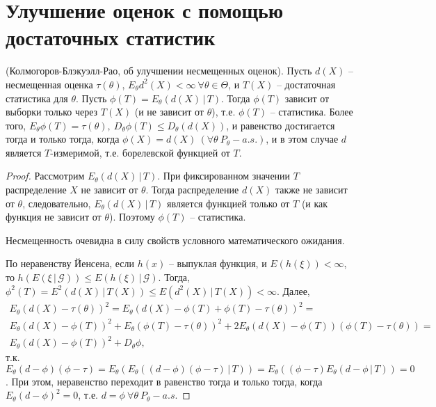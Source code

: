    \section{Улучшение оценок с помощью достаточных статистик}
    
    \begin{theorem}
        (Колмогоров-Блэкуэлл-Рао, об улучшении несмещенных оценок). Пусть $d(X)$ -- несмещенная оценка $\tau(\theta)$, $E_\theta d^2(X) < \infty\ \forall \theta \in \Theta$, и $T(X)$ -- достаточная статистика для $\theta$. Пусть $\phi(T) = E_\theta(d(X)\, \vert\, T)$. Тогда $\phi(T)$ зависит от выборки только через $T(X)$ (и не зависит от $\theta$), т.е. $\phi(T)$ -- статистика. Более того, $E_\theta \phi(T) = \tau(\theta),\ D_\theta \phi(T) \leq D_\theta(d(X))$, и равенство достигается тогда и только тогда, когда $\phi(X) = d(X)\ (\forall \theta\ P_\theta-a.s.)$, и в этом случае $d$ является $T$-измеримой, т.е. борелевской функцией от $T$.
    \end{theorem}
    
    \begin{proof}
        Рассмотрим  $E_\theta(d(X)\, \vert\, T)$. При фиксированном значении $T$ распределение $X$ не зависит от $\theta$. Тогда распределение $d(X)$ также не зависит от $\theta$, следовательно, $E_\theta(d(X)\, \vert\, T)$ является функцией только от $T$ (и как функция не зависит от $\theta$). Поэтому $\phi(T)$ -- статистика.
        
        Несмещенность очевидна в силу свойств условного математического ожидания.
        
        По неравенству Йенсена, если $h(x)$ -- выпуклая функция, и $E(h(\xi))<\infty$, то $h(E(\xi\, \vert\, \mathcal{G})) \leq E(h(\xi)\, \vert\, \mathcal{G})$. Тогда, $\phi^2(T) = E^2(d(X)\, \vert\, T(X)) \leq E(d^2(X)\, \vert\, T(X)) < \infty$. Далее,
        \begin{gather*}
            E_\theta(d(X) - \tau(\theta))^2 = E_\theta(d(X) - \phi(T) + \phi(T) - \tau(\theta))^2 =\\
            E_\theta(d(X) - \phi(T))^2 + E_\theta(\phi(T) - \tau(\theta))^2 + 2E_\theta(d(X) - \phi(T))(\phi(T) - \tau(\theta)) =\\ E_\theta(d(X) - \phi(T))^2 + D_\theta\phi,
        \end{gather*}
        т.к. $E_\theta(d - \phi)(\phi - \tau) = E_\theta(E_\theta((d-\phi)(\phi - \tau)\, \vert\, T)) = E_\theta((\phi - \tau)E_\theta(d - \phi\, \vert\, T)) = 0$.
        При этом, неравенство переходит в равенство тогда и только тогда, когда $E_\theta(d-\phi)^2 = 0$, т.е. $d=\phi\ \forall \theta\ P_\theta-a.s.$
    \end{proof}
    
